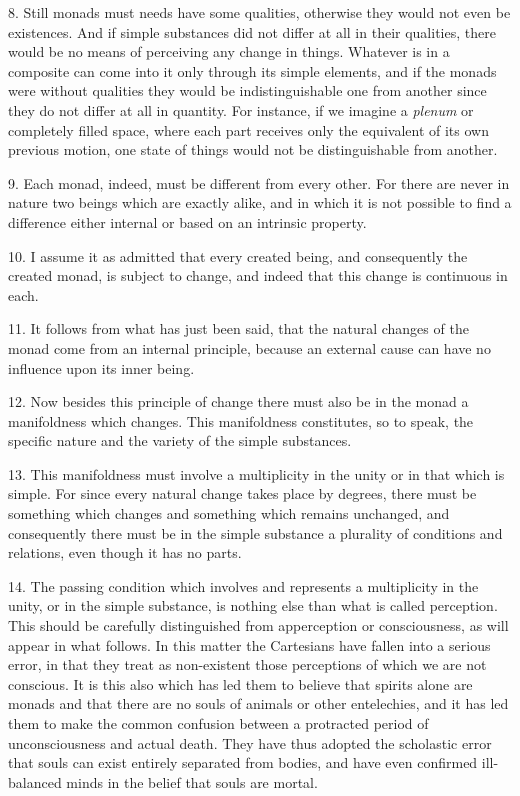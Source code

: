 8. Still monads must needs have some qualities, otherwise they would
not even be existences. And if simple substances did not differ at all
in their qualities, there would be no means of perceiving any change
in things. Whatever is in a composite can come into it only through
its simple elements, and if the monads were without qualities they would be
indistinguishable one from another since they do not differ at all in
quantity. For instance, if we imagine a \textit{plenum} or completely
filled space, where each part receives only the equivalent of its own
previous motion, one state of things would not be distinguishable from
another.

9. Each monad, indeed, must be different from every other. For there
are never in nature two beings which are exactly alike, and in which
it is not possible to find a difference either internal or based on an
intrinsic property.

10. I assume it as admitted that every created being, and consequently
the created monad, is subject to change, and indeed that this change
is continuous in each.

11. It follows from what has just been said, that  the
natural changes of the monad come from an internal principle, because
an external cause can have no influence upon its inner being.

12. Now besides this principle of change there must also be in the
monad a manifoldness which changes. This manifoldness constitutes, so
to speak, the specific nature and the variety of the simple
substances.

13. This manifoldness must involve a multiplicity in the unity or in
that which is simple. For since every natural change takes place by
degrees, there must be something which changes and something which
remains unchanged, and consequently there must be in the simple
substance a plurality of conditions and relations, even though it has
no parts.

14. The passing condition which involves and represents a multiplicity
in the unity, or in the simple substance, is nothing else than what is
called perception. This should be carefully distinguished from
apperception or consciousness, as will appear in what follows. In this
matter the Cartesians have fallen into a serious error, in that they
treat as non-existent those perceptions of which we are not conscious.
It is this also which has led them to believe that spirits alone are
monads and that there are no souls of animals or other entelechies,
and it has led them to make the common confusion between a protracted
period of unconsciousness and actual death. They have thus adopted the
scholastic error that souls can exist entirely separated from bodies,
and have even confirmed ill-balanced minds in the belief that souls
are mortal.


